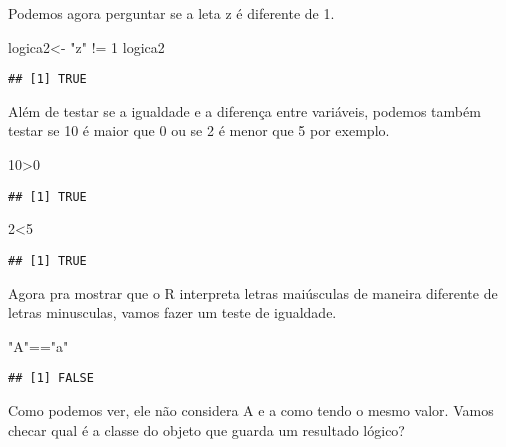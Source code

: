 \documentclass[
]{article}
\newenvironment{Shaded}{\begin{snugshade}}{\end{snugshade}}
\newcommand{\DecValTok}[1]{\textcolor[rgb]{0.00,0.00,0.81}{#1}}
\newcommand{\NormalTok}[1]{#1}
\newcommand{\OtherTok}[1]{\textcolor[rgb]{0.56,0.35,0.01}{#1}}
\newcommand{\SpecialCharTok}[1]{\textcolor[rgb]{0.00,0.00,0.00}{#1}}
\newcommand{\StringTok}[1]{\textcolor[rgb]{0.31,0.60,0.02}{#1}}
\begin{document}
Podemos agora perguntar se a leta z é diferente de 1.

\begin{Shaded}
\begin{Highlighting}[]
\NormalTok{logica2}\OtherTok{\textless{}{-}} \StringTok{"z"} \SpecialCharTok{!=} \DecValTok{1}
\NormalTok{logica2}
\end{Highlighting}
\end{Shaded}

\begin{verbatim}
## [1] TRUE
\end{verbatim}

Além de testar se a igualdade e a diferença entre variáveis, podemos
também testar se 10 é maior que 0 ou se 2 é menor que 5 por exemplo.

\begin{Shaded}
\begin{Highlighting}[]
\DecValTok{10}\SpecialCharTok{\textgreater{}}\DecValTok{0}
\end{Highlighting}
\end{Shaded}

\begin{verbatim}
## [1] TRUE
\end{verbatim}

\begin{Shaded}
\begin{Highlighting}[]
\DecValTok{2}\SpecialCharTok{\textless{}}\DecValTok{5}
\end{Highlighting}
\end{Shaded}

\begin{verbatim}
## [1] TRUE
\end{verbatim}

Agora pra mostrar que o R interpreta letras maiúsculas de maneira
diferente de letras minusculas, vamos fazer um teste de igualdade.

\begin{Shaded}
\begin{Highlighting}[]
\StringTok{"A"}\SpecialCharTok{==}\StringTok{"a"}
\end{Highlighting}
\end{Shaded}

\begin{verbatim}
## [1] FALSE
\end{verbatim}

Como podemos ver, ele não considera A e a como tendo o mesmo valor.
Vamos checar qual é a classe do objeto que guarda um resultado lógico?
\end{document}
